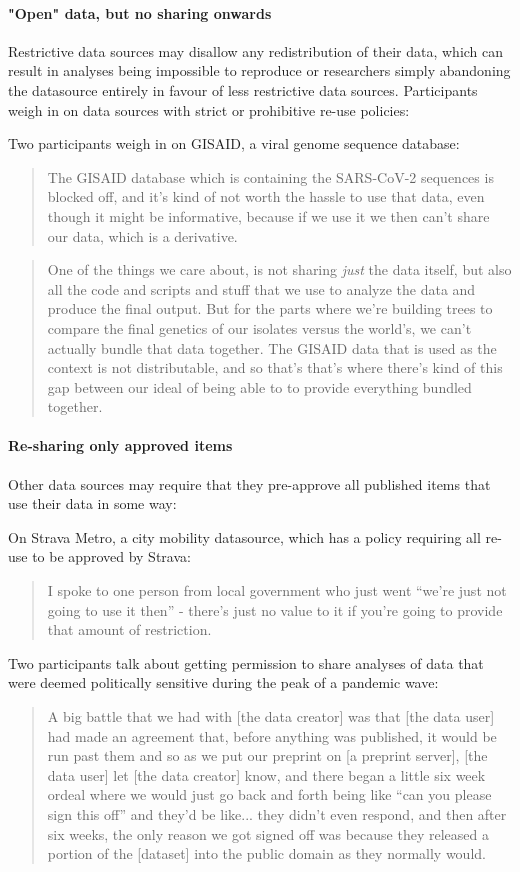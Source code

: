 \documentclass{CUP-JNL-DAP}%
\begin{document}
\paragraph{"Open" data, but no sharing onwards}

Restrictive data sources may disallow any redistribution of their data, which can result in analyses being impossible to reproduce or researchers simply abandoning the datasource entirely in favour of less restrictive data sources. Participants weigh in on data sources with strict or prohibitive re-use policies: 

 Two participants weigh in on GISAID, a viral genome sequence database: 
\blockquote{The GISAID database which is containing the SARS-CoV-2 sequences is blocked off, and it's kind of not worth the hassle to use that data, even though it might be informative, because if we use it we then can't share our data, which is a derivative.}

\blockquote{One of the things we care about, is not sharing \textit{just} the data itself, but also all the code and scripts and stuff that we use to analyze the data and produce the final output. But for the parts where we're building trees to compare the final genetics of our isolates versus the world's, we can't actually bundle that data together. The GISAID data that is used as the context is not distributable, and so that's that's where there's kind of this gap between our ideal of being able to to provide everything bundled together. }

\paragraph{Re-sharing only approved items}
Other data sources may require that they pre-approve all published items that use their data in some way:

On Strava Metro, a city mobility datasource, which has a policy requiring all re-use to be approved by Strava:

\blockquote {I spoke to one person from local government who just went \enquote{we're just not going to use it then} - there's just no value to it if you're going to provide that amount of restriction.}

Two participants talk about getting permission to share analyses of data that were deemed politically sensitive during the peak of a pandemic wave: 

\blockquote{A big battle that we had with [the data creator] was that [the data user] had made an agreement that, before anything was published, it would be run past them and so as we put our  preprint on [a preprint server], [the data user] let [the data creator] know, and there began a little six week ordeal where we would just go back and forth being like \enquote{can you please sign this off} and they'd be like... they didn't even respond, and then after six weeks, the only reason we got signed off was because they released a portion of the [dataset] into the public domain as they normally would.}
\end{document}
